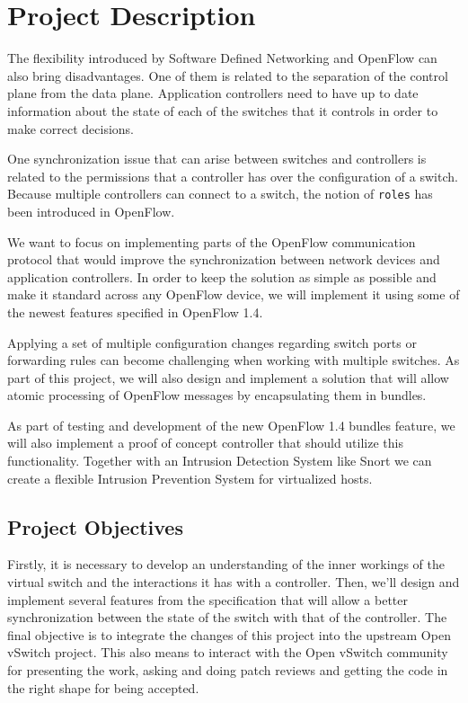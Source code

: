 \section{Project Description}
\label{sec:proj}

The flexibility introduced by Software Defined Networking and OpenFlow can also bring disadvantages. One
of them is related to the separation of the control plane from the data plane. Application controllers
need to have up to date information about the state of each of the switches that it controls in order to
make correct decisions.

One synchronization issue that can arise between switches and controllers is related to the permissions
that a controller has over the configuration of a switch. Because multiple controllers can connect to a
switch, the notion of \texttt{roles} has been introduced in OpenFlow.

We want to focus on implementing parts of the OpenFlow communication protocol that would improve
the synchronization between network devices and application controllers. In order to keep the solution
as simple as possible and make it standard across any OpenFlow device, we will implement it using
some of the newest features specified in OpenFlow 1.4.

Applying a set of multiple configuration changes regarding switch ports or forwarding rules can become
challenging when working with multiple switches. As part of this project, we will also design and implement
a solution that will allow atomic processing of OpenFlow messages by encapsulating them in bundles.

As part of testing and development of the new OpenFlow 1.4 bundles feature, we will also implement a proof of concept
controller that should utilize this functionality. Together with an Intrusion Detection System like Snort\cite{snort}
we can create a flexible Intrusion Prevention System for virtualized hosts.


\subsection{Project Objectives}
\label{sub-sec:proj-objectives}

Firstly, it is necessary to develop an understanding of the inner workings of the virtual switch and the interactions
it has with a controller. Then, we'll design and implement several features from the specification that will
allow a better synchronization between the state of the switch with that of the controller. The final objective
is to integrate the changes of this project into the upstream Open vSwitch project. This also means to interact
with the Open vSwitch community for presenting the work, asking and doing patch reviews and getting the code in
the right shape for being accepted.



